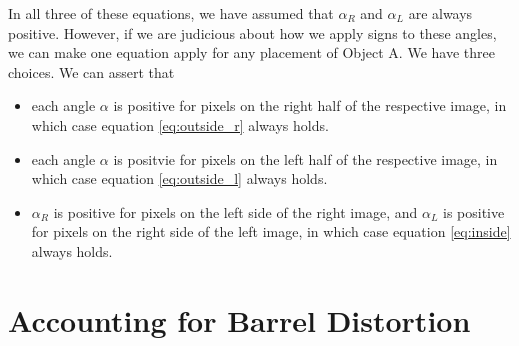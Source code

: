 \documentclass{article}
\begin{document}
In all three of these equations, we have assumed that $\alpha_R$ and $\alpha_L$ are always positive.
However, if we are judicious about how we apply signs to these angles, we can make one equation apply for any placement of Object A.
We have three choices. 
We can assert that 

\begin{itemize}
    \item each angle $\alpha$ is positive for pixels on the right half of the respective image, in which case equation \ref{eq:outside_r} always holds.
    \item each angle $\alpha$ is positvie for pixels on the left half of the respective image, in which case equation \ref{eq:outside_l} always holds.
    \item $\alpha_R$ is positive for pixels on the left side of the right image, and $\alpha_L$ is positive for pixels on the right side of the left image, in which case equation \ref{eq:inside} always holds. 
\end{itemize}

\section{Accounting for Barrel Distortion}
\end{document}
